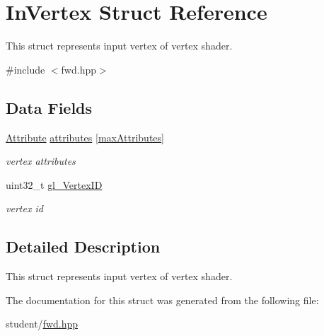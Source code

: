 \hypertarget{structInVertex}{}\section{In\+Vertex Struct Reference}
\label{structInVertex}


This struct represents input vertex of vertex shader.  




{\ttfamily \#include $<$fwd.\+hpp$>$}

\subsection*{Data Fields}
\begin{DoxyCompactItemize}
\item 
\mbox{\label{structInVertex_a4fc269d49110daa41aedf9b8f313f0ca}} 
\hyperlink{unionAttribute}{Attribute} \hyperlink{structInVertex_a4fc269d49110daa41aedf9b8f313f0ca}{attributes} \mbox{[}\hyperlink{fwd_8hpp_a176b31bcc8f8b93ee7ef0810ea77730b}{max\+Attributes}\mbox{]}
\begin{DoxyCompactList}\small\item\em vertex attributes \end{DoxyCompactList}\item 
\mbox{\label{structInVertex_aa4d31911053492bffe4b41dae12ee000}} 
uint32\+\_\+t \hyperlink{structInVertex_aa4d31911053492bffe4b41dae12ee000}{gl\+\_\+\+Vertex\+ID}
\begin{DoxyCompactList}\small\item\em vertex id \end{DoxyCompactList}\end{DoxyCompactItemize}


\subsection{Detailed Description}
This struct represents input vertex of vertex shader. 

The documentation for this struct was generated from the following file\+:\begin{DoxyCompactItemize}
\item 
student/\hyperlink{fwd_8hpp}{fwd.\+hpp}\end{DoxyCompactItemize}
